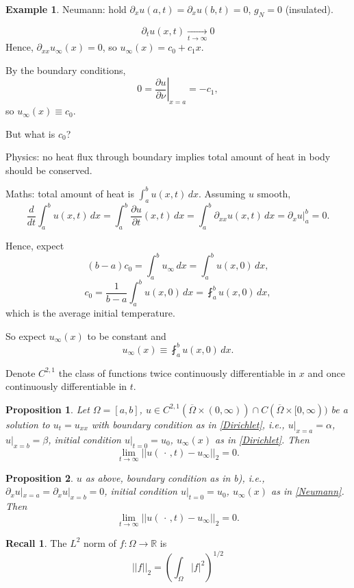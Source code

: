 \documentclass[12pt]{article}
\newtheorem{proposition}{Proposition}[section]
\theoremstyle{definition}
\newtheorem*{recall}{Recall}
\newtheorem*{example*}{Example}
\begin{document}
\begin{example*}
Neumann: hold $\partial_xu(a,t)=\partial_xu(b,t)=0$, $g_N=0$ (insulated).

\[\partial_tu(x,t)\xrightarrow[t\to\infty]{}0\]
Hence, $\partial_{xx}u_\infty(x)=0$, so $u_\infty(x)=c_0+c_1x$.

By the boundary conditions,
\[0=\left.\frac{\partial u}{\partial\nu}\right|_{x=a}=-c_1,\]
so $u_\infty(x)\equiv c_0$.

But what is $c_0$?

Physics: no heat flux through boundary implies total amount of heat in body should be conserved.

Maths: total amount of heat is $\int_a^bu(x,t)\,dx$. Assuming $u$ smooth,
\[\frac d{dt}\int_a^bu(x,t)\,dx=\int_a^b\frac{\partial u}{\partial t}(x,t)\,dx=\int_a^b\partial_{xx}u(x,t)\,dx=\partial_xu\Big|_a^b=0.\]

Hence, expect
\[(b-a)c_0=\int_a^bu_\infty\,dx=\int_a^bu(x,0)\,dx,\]
\[c_0=\frac1{b-a}\int_a^bu(x,0)\,dx=\fint_a^bu(x,0)\,dx,\]
which is the average initial temperature.

So expect $u_\infty(x)$ to be constant and
\[u_\infty(x)\equiv\fint_a^bu(x,0)\,dx.\]
\end{example*}

Denote $C^{2,1}$ the class of functions twice continuously differentiable in $x$ and once continuously differentiable in $t$.

\begin{proposition}\label{lim0_Dirichlet}
Let $\Omega=[a,b]$, $u\in C^{2,1}(\overline\Omega\times(0,\infty))\cap C(\overline\Omega\times[0,\infty))$ be a solution to $u_t=u_{xx}$ with boundary condition as in \ref{Dirichlet}, i.e., $u|_{x=a}=\alpha$, $u|_{x=b}=\beta$, initial condition $u|_{t=0}=u_0$, $u_\infty(x)$ as in \ref{Dirichlet}. Then
\[\lim_{t\to\infty}||u(\,\cdot\,,t)-u_\infty||_2=0.\]
\end{proposition}

\begin{proposition}\label{lim0_Neumann}
$u$ as above, boundary condition as in b), i.e., $\partial_xu|_{x=a}=\partial_xu|_{x=b}=0$, initial condition $u|_{t=0}=u_0$, $u_\infty(x)$ as in \ref{Neumann}. Then
\[\lim_{t\to\infty}||u(\,\cdot\,,t)-u_\infty||_2=0.\]
\end{proposition}

\begin{recall}
The $L^2$ norm of $f:\Omega\rightarrow\mathbb R$ is
\[||f||_2=\left(\int_\Omega|f|^2\right)^{1/2}\]
\end{recall}
\end{document}
